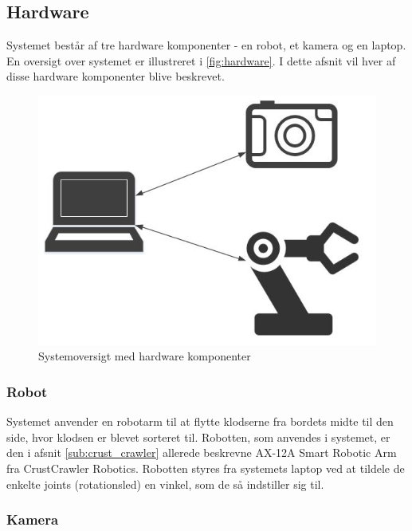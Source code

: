 \subsection{Hardware} %
\label{sub:hardware}

Systemet består af tre hardware komponenter - en robot, et kamera og en laptop.
En oversigt over systemet er illustreret i \autoref{fig:hardware}.
I dette afsnit vil hver af disse hardware komponenter blive beskrevet.


\begin{figure}[h]
\centering
\includegraphics[scale=0.5]{images/hardware}
\caption{Systemoversigt med hardware komponenter}
\label{fig:hardware}
\end{figure}

\subsubsection{Robot} %
\label{subsub:robot}

Systemet anvender en robotarm til at flytte klodserne fra bordets midte til den side, hvor klodsen er blevet sorteret til.
Robotten, som anvendes i systemet, er den i afsnit \ref{sub:crust_crawler} allerede beskrevne AX-12A Smart Robotic Arm fra CrustCrawler Robotics.
Robotten styres fra systemets laptop ved at tildele de enkelte joints (rotationsled) en vinkel, som de så indstiller sig til.


\subsubsection{Kamera} %
\label{subsub:camera}


